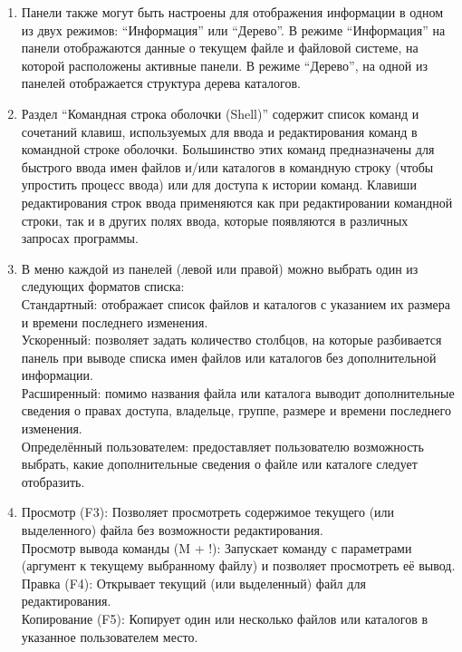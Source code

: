 \documentclass[
  english,
  russian,
  12pt,
  a4paper,
  DIV=11,
  numbers=noendperiod]{scrreprt}
\begin{document}
\begin{enumerate}
\def\labelenumi{\arabic{enumi}.}
\item
  Панели также могут быть настроены для отображения информации в одном
  из двух режимов: \enquote{Информация} или \enquote{Дерево}. В режиме
  \enquote{Информация} на панели отображаются данные о текущем файле и
  файловой системе, на которой расположены активные панели. В режиме
  \enquote{Дерево}, на одной из панелей отображается структура дерева
  каталогов.
\item
  Раздел \enquote{Командная строка оболочки (Shell)} содержит список
  команд и сочетаний клавиш, используемых для ввода и редактирования
  команд в командной строке оболочки. Большинство этих команд
  предназначены для быстрого ввода имен файлов и/или каталогов в
  командную строку (чтобы упростить процесс ввода) или для доступа к
  истории команд. Клавиши редактирования строк ввода применяются как при
  редактировании командной строки, так и в других полях ввода, которые
  появляются в различных запросах программы.
\item
  В меню каждой из панелей (левой или правой) можно выбрать один из
  следующих форматов списка:\\
  Стандартный: отображает список файлов и каталогов с указанием их
  размера и времени последнего изменения.\\
  Ускоренный: позволяет задать количество столбцов, на которые
  разбивается панель при выводе списка имен файлов или каталогов без
  дополнительной информации.\\
  Расширенный: помимо названия файла или каталога выводит дополнительные
  сведения о правах доступа, владельце, группе, размере и времени
  последнего изменения.\\
  Определённый пользователем: предоставляет пользователю возможность
  выбрать, какие дополнительные сведения о файле или каталоге следует
  отобразить.
\item
  Просмотр (F3): Позволяет просмотреть содержимое текущего (или
  выделенного) файла без возможности редактирования.\\
  Просмотр вывода команды (M + !): Запускает команду с параметрами
  (аргумент к текущему выбранному файлу) и позволяет просмотреть её
  вывод.\\
  Правка (F4): Открывает текущий (или выделенный) файл для
  редактирования.\\
  Копирование (F5): Копирует один или несколько файлов или каталогов в
  указанное пользователем место.\\

\end{enumerate}
\end{document}
